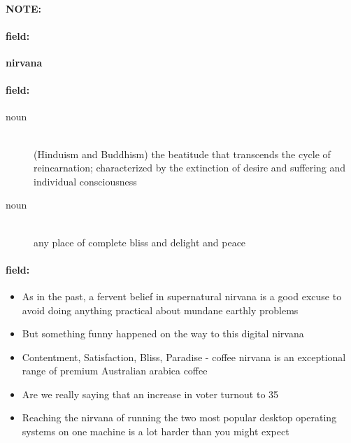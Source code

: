 \documentclass[12pt]{article}
\newenvironment{note}{\paragraph{NOTE:}}{}
\newenvironment{field}{\paragraph{field:}}{}
\begin{document}
\begin{note}
\begin{field}
\textbf{\large nirvana}
\end{field}


\begin{field}
\begin{description}
\item[noun] \hfill \\ 
(Hinduism and Buddhism) the beatitude that transcends the cycle of reincarnation; characterized by the extinction of desire and suffering and individual consciousness

\item[noun] \hfill \\ 
any place of complete bliss and delight and peace

\end{description}
\end{field}

\begin{field}
\begin{itemize}
\item As in the past, a fervent belief in supernatural nirvana is a good excuse to avoid doing anything practical about mundane earthly problems
\item But something funny happened on the way to this digital nirvana
\item Contentment, Satisfaction, Bliss, Paradise - coffee nirvana is an exceptional range of premium Australian arabica coffee
\item Are we really saying that an increase in voter turnout to 35 %
\item Reaching the nirvana of running the two most popular desktop operating systems on one machine is a lot harder than you might expect
\end{itemize}
\end{field}
\end{note}
\end{document}
